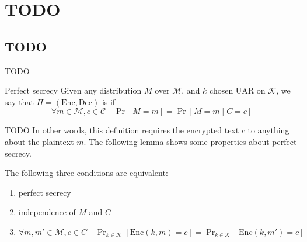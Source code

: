 \documentclass[a4paper, 12pt]{report}
\institute{\curlyquotes{\hspace{0.25mm}Sapienza} Università di Roma}
\subtitle{Appunti integrati con il libro \book}
\author{\textit{Autore}\\\authorName}
\institute{\curlyquotes{\hspace{0.25mm}Sapienza} University of Rome}
\subtitle{Lecture notes integrated with the book \book}
\author{\textit{Author}\\\authorName}
\title{\courseName}
\date{\today}
\begin{document}
\maketitle

{
	\hypersetup{allcolors=black}

	\romantableofcontents
}

\introduction


\chapter{TODO}

\section{TODO}

TODO 

\begin{frameddefn}{Perfect secrecy}
	Given any distribution $M$ over $\mathcal M$, and $k$ chosen UAR on $\mathcal K$, we say that $\Pi = (\mathrm{Enc}, \mathrm{Dec})$ is  if $$\forall m \in \mathcal M, c \in \mathcal C \quad \Pr[M = m] = \Pr[M = m \mid C = c]$$
\end{frameddefn}

TODO  In other words, this definition requires the encrypted text $c$ to  anything about the plaintext $m$. The following lemma shows some properties about perfect secrecy.

\begin{framedlem}{}
	The following three conditions are equivalent:

	\begin{enumerate}
		\item perfect secrecy
		\item independence of $M$ and $C$
		\item $\forall m, m' \in \mathcal M, c \in C \quad \Pr_{k \in \mathcal K}[\mathrm{Enc}(k, m) = c] = \Pr_{k \in \mathcal K}[\mathrm{Enc}(k, m') = c]$
	\end{enumerate}
\end{framedlem}
\end{document}
